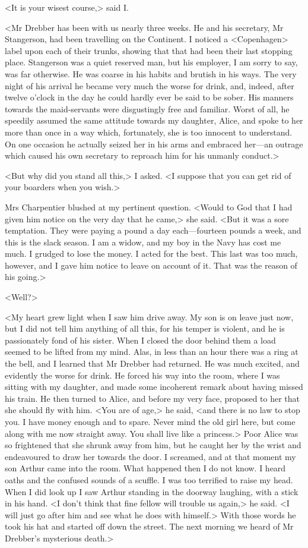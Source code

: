 <It is your wisest course,> said I\@.

<Mr Drebber has been with us nearly three weeks. He and his secretary, Mr Stangerson, had been travelling on the Continent. I noticed a <Copenhagen> label upon each of their trunks, showing that that had been their last stopping place. Stangerson was a quiet reserved man, but his employer, I am sorry to say, was far otherwise. He was coarse in his habits and brutish in his ways. The very night of his arrival he became very much the worse for drink, and, indeed, after twelve o'clock in the day he could hardly ever be said to be sober. His manners towards the maid-servants were disgustingly free and familiar. Worst of all, he speedily assumed the same attitude towards my daughter, Alice, and spoke to her more than once in a way which, fortunately, she is too innocent to understand. On one occasion he actually seized her in his arms and embraced her—an outrage which caused his own secretary to reproach him for his unmanly conduct.>

<But why did you stand all this,> I asked. <I suppose that you can get rid of your boarders when you wish.>

Mrs Charpentier blushed at my pertinent question. <Would to God that I had given him notice on the very day that he came,> she said. <But it was a sore temptation. They were paying a pound a day each—fourteen pounds a week, and this is the slack season. I am a widow, and my boy in the Navy has cost me much. I grudged to lose the money. I acted for the best. This last was too much, however, and I gave him notice to leave on account of it. That was the reason of his going.>

<Well?>

<My heart grew light when I saw him drive away. My son is on leave just now, but I did not tell him anything of all this, for his temper is violent, and he is passionately fond of his sister. When I closed the door behind them a load seemed to be lifted from my mind. Alas, in less than an hour there was a ring at the bell, and I learned that Mr Drebber had returned. He was much excited, and evidently the worse for drink. He forced his way into the room, where I was sitting with my daughter, and made some incoherent remark about having missed his train. He then turned to Alice, and before my very face, proposed to her that she should fly with him. <You are of age,> he said, <and there is no law to stop you. I have money enough and to spare. Never mind the old girl here, but come along with me now straight away. You shall live like a princess.> Poor Alice was so frightened that she shrunk away from him, but he caught her by the wrist and endeavoured to draw her towards the door. I screamed, and at that moment my son Arthur came into the room. What happened then I do not know. I heard oaths and the confused sounds of a scuffle. I was too terrified to raise my head. When I did look up I saw Arthur standing in the doorway laughing, with a stick in his hand. <I don't think that fine fellow will trouble us again,> he said. <I will just go after him and see what he does with himself.> With those words he took his hat and started off down the street. The next morning we heard of Mr Drebber's mysterious death.>


